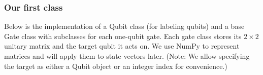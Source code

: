 \documentclass{beamer}
\begin{document}
\begin{frame}
\frametitle{Our first class}

Below is the implementation of a Qubit class (for labeling qubits) and
a base Gate class with subclasses for each one-qubit gate. Each gate
class stores its $2\times 2$ unitary matrix and the target qubit it
acts on. We use NumPy to represent matrices and will apply them to
state vectors later. (Note: We allow specifying the target as either a
Qubit object or an integer index for convenience.)



































































































\end{frame}
\end{document}
